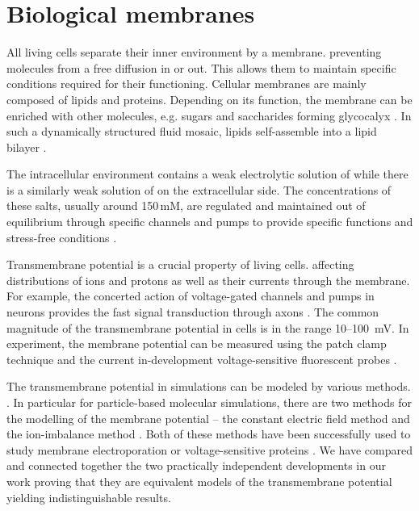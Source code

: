 \chapter{Biological membranes}
\label{chap:intro}


All living cells separate their inner environment by a membrane. 
preventing molecules from a free diffusion in or out. 
This allows them to maintain specific conditions required for their functioning. 
Cellular membranes are mainly composed of lipids and proteins. 
Depending on its function, the membrane can be enriched with other molecules, e.g. sugars and saccharides forming glycocalyx \citep{reitsma07}. 
In such a dynamically structured fluid mosaic,  %
lipids self-assemble into a lipid bilayer \citep{vereb03,Mouritsen2011,Vattulainen2011}.

The intracellular environment contains a weak electrolytic solution of  
while there is a similarly weak solution of  on the extracellular side. 
The concentrations of these salts, usually around 150\,mM, 
are regulated and maintained out of equilibrium through specific channels and pumps 
to provide specific functions and stress-free conditions \citep{Bezanilla2008, Knudsen_book2002}. 

Transmembrane potential is a crucial property of living cells.  
affecting distributions of ions and protons as well as their currents through the membrane. 
For example, the concerted action of voltage-gated channels and pumps in neurons 
provides the fast signal transduction through axons \citep{Knudsen_book2002, Storace2015, Sung2015}. 
The common magnitude of the transmembrane potential in cells is in the range 10--100~mV. 
In experiment, the membrane potential can be measured using the patch clamp technique \citep{Bezanilla2008}
and the current in-development voltage-sensitive fluorescent probes \citep{Storace2015, Sung2015}. 

The transmembrane potential in simulations can be modeled by various methods. \citep{Roux1997,Tieleman2001,Sin2015, Roux2008,Gumbart2012, Sachs2004,Delemotte2008}.
In particular for particle-based molecular simulations, 
there are two methods for the modelling of the membrane potential --
 the constant electric field method \citep{Roux1997,Roux2008,Gumbart2012} and
 the ion-imbalance method \citep{Sachs2004,Delemotte2008}. 
Both of these methods have been successfully used to study membrane electroporation or voltage-sensitive proteins \cite{Vargas2012, bockmann_kinetics_2008, gumbart_constant_2012, kutzner_computational_2011, casciola_molecular_2014}. 
We have compared and connected together the two practically independent developments in our work \citep{melcr16}
proving that they are equivalent models of the transmembrane potential yielding indistinguishable results.




